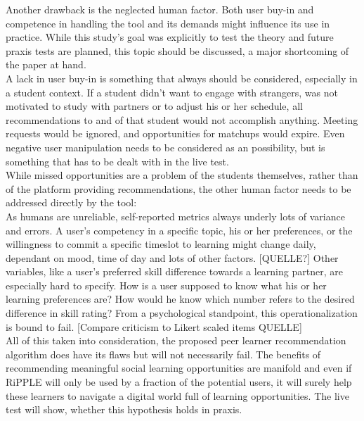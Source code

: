 \documentclass[nochapterpage,bigchapter,linedtoc,longdoc,colorback,accentcolor=tud3b]{tudreport}
\begin{document}
Another drawback is the neglected human factor. Both user buy-in and competence in handling the tool and its demands might influence its use in practice. While this study's goal was explicitly to test the theory and future praxis tests are planned, this topic should be discussed, a major shortcoming of the paper at hand.\\
A lack in user buy-in is something that always should be considered, especially in a student context. If a student didn't want to engage with strangers, was not motivated to study with partners or to adjust his or her schedule, all recommendations to and of that student would not accomplish anything. Meeting requests would be ignored, and opportunities for matchups would expire. Even negative user manipulation needs to be considered as an possibility, but is something that has to be dealt with in the live test.\\
While missed opportunities are a problem of the students themselves, rather than of the platform providing recommendations, the other human factor needs to be addressed directly by the tool:\\
As humans are unreliable, self-reported metrics always underly lots of variance and errors. A user's competency in a specific topic, his or her preferences, or the willingness to commit a specific timeslot to learning might change daily, dependant on mood, time of day and lots of other factors. [QUELLE?] Other variables, like a user's preferred skill difference towards a learning partner, are especially hard to specify. How is a user supposed to know what his or her learning preferences are? How would he know which number refers to the desired difference in skill rating? From a psychological standpoint, this operationalization is bound to fail. [Compare criticism to Likert scaled items QUELLE]\\
All of this taken into consideration, the proposed peer learner recommendation algorithm does have its flaws but will not necessarily fail. The benefits of recommending meaningful social learning opportunities are manifold and even if RiPPLE will only be used by a fraction of the potential users, it will surely help these learners to navigate a digital world full of learning opportunities. The live test will show, whether this hypothesis holds in praxis.\\
\end{document}
